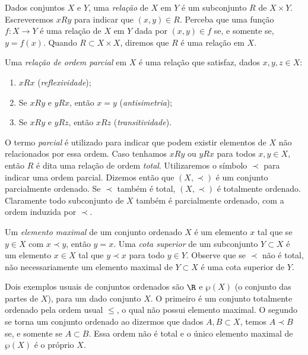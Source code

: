 Dados conjuntos \( X \) e \( Y \), uma \emph{relação} de \( X \) em \( Y \) é um subconjunto \( R \) de \( X \times Y \). 
Escreveremos \( x R y \) para indicar que \( ( x, y ) \in R \).
Perceba que uma função \( f : X \to Y \) é uma relação de \( X \) em \( Y \) dada por \( ( x, y ) \in f \) se, e somente se, \( y = f(x) \).
Quando \( R \subset X \times X \), diremos que \( R \) é uma relação em \( X \).

Uma \emph{relação de ordem parcial} em \( X \) é uma relação que satisfaz, dados \( x, y, z \in X \):
\begin{enumerate}[label=(\roman*)]
    \item \( x R x \) (\emph{reflexividade});
    \item Se \( x R y \) e \( y R x \), então \( x = y \) (\emph{antisimetria});
    \item Se \( x R y \) e \( y R z \), então \( x R z \) (\emph{transitividade}).
\end{enumerate}
O termo \emph{parcial} é utilizado para indicar que podem existir elementos de \( X \) não relacionados por essa ordem.
Caso tenhamos \( x R y \) ou \( y R x \) para todos \( x, y \in X \), então \( R \) é dita uma relação de ordem \emph{total}.
Utilizaremos o símbolo \( \prec \) para indicar uma ordem parcial.
Dizemos então que \( ( X, \prec ) \) é um conjunto parcialmente ordenado.
Se \( \prec \) também é total, \( ( X, \prec ) \) é totalmente ordenado.
Claramente todo subconjunto de \( X \) também é parcialmente ordenado, com a ordem induzida por \( \prec \).

Um \emph{elemento maximal} de um conjunto ordenado \( X \) é um elemento \( x \) tal que se \( y \in X \) com \( x \prec y \), então \( y = x \).
Uma \emph{cota superior} de um subconjunto \( Y \subset X \) é um elemento \( x \in X \) tal que \( y \prec x \) para todo \( y \in Y \).
Observe que se \( \prec \) não é total, não necessariamente um elemento maximal de \( Y \subset X \) é uma cota superior de \( Y \).

Dois exemplos usuais de conjuntos ordenados são \( \R \) e \( \wp ( X ) \) (o conjunto das partes de \( X \)), para um dado conjunto \( X \).
O primeiro é um conjunto totalmente ordenado pela ordem usual \( \leq \), o qual não possui elemento maximal.
O segundo se torna um conjunto ordenado ao dizermos que dados \( A, B \subset X \), temos \( A \prec B \) se, e somente se \( A \subset  B \).
Essa ordem não é total e o único elemento maximal de \( \wp ( X ) \) é o próprio \( X \).

